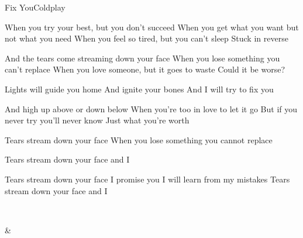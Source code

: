 \documentclass[a4paper,11pt,french]{article}
\begin{document}
\begin{Song}{Fix You}{Coldplay}
\begin{multicols}{2}

\begin{Verse}
When you try your best, but you don't succeed
When you get what you want but not what you need
When you feel so tired, but you can't sleep
Stuck in reverse
\espaceInterStrophe

And the tears come streaming down your face
When you lose something you can't replace
When you love someone, but it goes to waste
Could it be worse?
\end{Verse}
\espaceInterStrophe

\begin{Chorus}
Lights will guide you home
And ignite your bones
And I will try to fix you
\end{Chorus}
\espaceInterStrophe

\begin{Verse}
And high up above or down below
When you're too in love to let it go
But if you never try you'll never know
Just what you're worth
\end{Verse}
\espaceInterStrophe

\tochorus
\espaceInterStrophe

\espaceInterStrophe

\begin{Bridge}
Tears stream down your face
When you lose something you cannot replace
\espaceInterStrophe

Tears stream down your face and I
\espaceInterStrophe

Tears stream down your face
I promise you I will learn from my mistakes
Tears stream down your face and I
\end{Bridge}
\espaceInterStrophe

\tochorus

\vfill
~

\end{multicols}

\vfill

\begin{multicols}{2}

\gridGroupNormal

\begin{Chords}[Verse]
\hline
{} & \\\hline
\end{Chords}
\espaceInterGrille


\end{multicols}
\end{Song}
\end{document}
